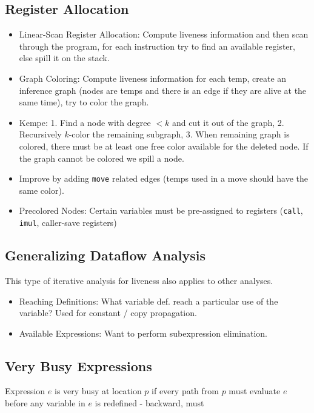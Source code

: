\subsection*{Register Allocation}
\begin{itemize}
	\item Linear-Scan Register Allocation: Compute liveness information and then scan through the program, for each instruction try to find an available register, else spill it on the stack.
	
	\item Graph Coloring: Compute liveness information for each temp, create an inference graph (nodes are temps and there is an edge if they are alive at the same time), try to color the graph.
	
	\item Kempe: 1. Find a node with degree $< k$ and cut it out of the graph, 2. Recursively $k$-color the remaining subgraph, 3. When remaining graph is colored, there must be at least one free color available for the deleted node. If the graph cannot be colored we spill a node.
	\item Improve by adding \texttt{move} related edges (temps used in a move should have the same color).
	
	\item Precolored Nodes: Certain variables must be pre-assigned to registers (\texttt{call}, \texttt{imul}, caller-save registers)
\end{itemize}


\subsection*{Generalizing Dataflow Analysis}
This type of iterative analysis for liveness also applies to other analyses.

\begin{itemize}
	\item Reaching Definitions: What variable def. reach a particular use of the variable? Used for constant / copy propagation.
	\item Available Expressions: Want to perform subexpression elimination.
\end{itemize}


\subsection*{Very Busy Expressions}
Expression $e$ is very busy at location $p$ if every path from $p$ must evaluate $e$ before any variable in $e$ is redefined - backward, must


